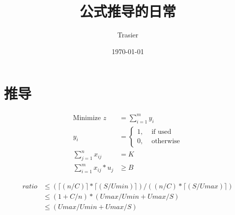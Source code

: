 \documentclass[UTF8]{ctexart}
\begin{document}
\title{\Huge 公式推导的日常}
\vspace{2cm}
\author{\Large Trasier}
\date{\today}
\maketitle

\section{推导}

\begin{align*}
    \text{Minimize } z &= \sum\limits_{i=1}^m y_i \\
                    y_i &= \left \{
                                \begin{aligned}
                                    1, &\text{ if used} \\
                                    0, &\text{ otherwise}
                                \end{aligned}
                            \right . \\
                    \sum\limits_{j=1}^n x_{ij} &= K \\
                    \sum\limits_{i=1}^m x_{ij}*u_j &\ge B
\end{align*}


\begin{align*}
    ratio &\le (\lceil(n/C)\rceil * \lceil(S/Umin)\rceil) / ((n/C) * \lceil(S/Umax)\rceil)  \\
          &\le (1+C/n) * (Umax/Umin + Umax/S) \\
          &\le (Umax/Umin + Umax/S)
\end{align*}
\end{document}
